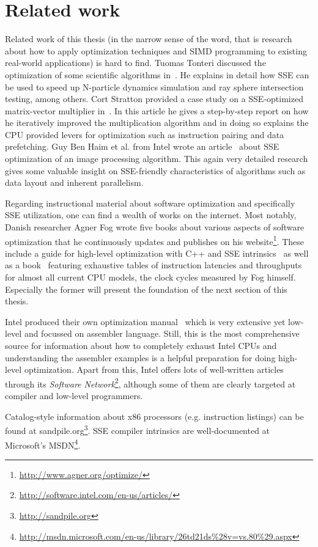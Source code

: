 \section{Related work}
\label{Related_work}

Related work of this thesis (in the narrow sense of the word, that is research about how to apply optimization techniques and SIMD programming to existing real-world applications) is hard to find. Tuomas Tonteri discussed the optimization of some scientific algorithms in~\cite{tonteri2012}. He explains in detail how SSE can be used to speed up N-particle dynamics simulation and ray sphere intersection testing, among others. Cort Stratton provided a case study on a SSE-optimized matrix-vector multiplier in~\cite{stratton2002}. In this article he gives a step-by-step report on how he iteratively improved the multiplication algorithm and in doing so explains the CPU provided levers for optimization such as instruction pairing and data prefetching. Guy Ben Haim et al. from Intel wrote an article~\cite{haim2009} about SSE optimization of an image processing algorithm. This again very detailed research gives some valuable insight on SSE-friendly characteristics of algorithms such as data layout and inherent parallelism.

Regarding instructional material about software optimization and specifically SSE utilization, one can find a wealth of works on the internet. Most notably, Danish researcher Agner Fog wrote five books about various aspects of software optimization that he continuously updates and publishes on his website\footnote{\url{http://www.agner.org/optimize/}}. These include a guide for high-level optimization with C++ and SSE intrinsics~\cite{fog2011optimizing} as well as a book~\cite{fog2011instructiontables} featuring exhaustive tables of instruction latencies and throughputs for almost all current CPU models, the clock cycles measured by Fog himself. Especially the former will present the foundation of the next section of this thesis.

Intel produced their own optimization manual~\cite{intel2011manual} which is very extensive yet low-level and focussed on assembler language. Still, this is the most comprehensive source for information about how to completely exhaust Intel CPUs and understanding the assembler examples is a helpful preparation for doing high-level optimization. Apart from this, Intel offers lots of well-written articles through its \emph{Software Network}\footnote{\url{http://software.intel.com/en-us/articles/}}, although some of them are clearly targeted at compiler and low-level programmers.

Catalog-style information about x86 processors (e.g. instruction listings) can be found at sandpile.org\footnote{\url{http://sandpile.org}}. SSE compiler intrinsics are well-documented at Microsoft's MSDN\footnote{\url{http://msdn.microsoft.com/en-us/library/26td21ds\%28v=vs.80\%29.aspx}}.
